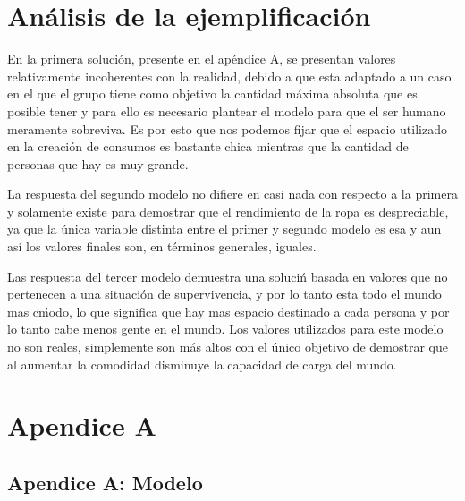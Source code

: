 \documentclass[12pt]{report}
\begin{document}
\section*{An\'alisis de la ejemplificaci\'on}
En la primera soluci\'on, presente en el ap\'endice A, se presentan valores relativamente incoherentes con la realidad, debido a que esta adaptado a un caso en el que el grupo tiene como objetivo la cantidad m\'axima absoluta que es posible tener y para ello es necesario plantear el modelo para que el ser humano meramente sobreviva. Es por esto que nos podemos fijar que el espacio utilizado en la creaci\'on de consumos es bastante chica mientras que la cantidad de personas que hay es muy grande. 

La respuesta del segundo modelo no difiere en casi nada con respecto a la primera y solamente existe para demostrar que el rendimiento de la ropa es despreciable, ya que la \'unica variable distinta entre el primer y segundo modelo es esa y aun as\'i los valores finales son, en t\'erminos generales, iguales. 

Las respuesta del tercer modelo demuestra una soluci\'n basada en valores que no pertenecen a una situaci\'on de supervivencia, y por lo tanto esta todo el mundo mas c\'modo, lo que significa que hay mas espacio destinado a cada persona y por lo tanto cabe menos gente en el mundo. Los valores utilizados para este modelo no son reales, simplemente son m\'as altos con el \'unico objetivo de demostrar que al aumentar la comodidad disminuye la capacidad de carga del mundo.





\section*{Apendice A}
\subsection*{Apendice A: Modelo}
\end{document}
